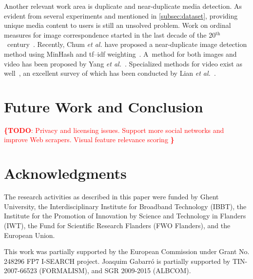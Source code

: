 \documentclass{acm_proc_article-sp}
\let\oldemph\emph
\renewcommand{\emph}[1]{\oldemph{\fontsize{9}{9}\selectfont #1}}
\newcommand{\todo}[1]{\noindent\textcolor{red}{{\bf \{TODO}: #1{\bf \}}}}
\newcommand{\inlinelistingsize}{\fontsize{8pt}{11pt}}
\let\oldttdefault\ttdefault
\renewcommand{\ttdefault}{pcr}
\let\oldurl\url
\renewcommand{\url}[1]{\inlinelistingsize\oldurl{#1}}
\newcommand{\superscript}[1]{\ensuremath{^{\textrm{#1}}}}
\begin{document}
Another relevant work area is duplicate and near-duplicate media detection.
As evident from several experiments and mentioned in \autoref{subsec:dataset},
providing unique media content to users is still an unsolved problem.
Work on ordinal measures for image correspondence started in the last decade of the 20\superscript{th}~century~\cite{Bhat}.
Recently, Chum \emph{et al.} have proposed a near-duplicate image detection method using MinHash and tf--idf weighting~\cite{Chum}.
A~method for both images and video has been proposed by Yang \emph{et al.}~\cite{Yang}.
Specialized methods for video exist as well~\cite{Min, Wu}, an excellent survey of which has been conducted by Lian \emph{et al.}~\cite{Lian}.

\section{Future Work and Conclusion}
\todo{
Privacy and licensing issues.
Support more social networks and improve Web scrapers.
Visual feature relevance scoring
}

\section*{Acknowledgments}
The research activities as described in this paper were funded by Ghent University, the Interdisciplinary Institute for Broadband Technology (IBBT), the Institute for the Promotion of Innovation by Science and Technology in Flanders (IWT), the Fund for Scientific Research Flanders (FWO Flanders), and the European Union.

This work was partially supported by the European Commission under Grant No. 248296 FP7 \mbox{I-SEARCH} project.
Joaquim Gabarr\'o is partially supported by TIN-2007-66523 (FORMALISM), and SGR 2009-2015 (\mbox{ALBCOM}).

\let\ttdefault\oldttdefault
\let\url\oldurl




\balancecolumns
\end{document}
